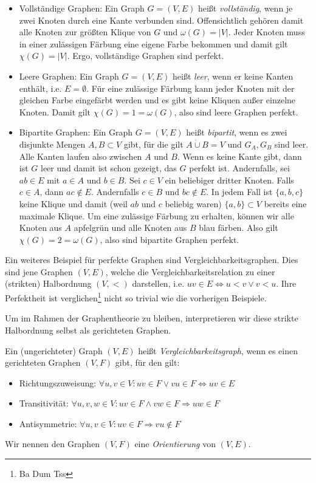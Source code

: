 \documentclass[../main.tex]{subfiles}
\begin{document}
\begin{itemize}
    \item Vollständige Graphen: Ein Graph $G = (V, E)$ heißt \emph{vollständig}, wenn je zwei Knoten durch eine Kante verbunden sind. Offensichtlich gehören damit alle Knoten zur größten Klique von $G$ und $\omega(G) = |V|$. Jeder Knoten muss in einer zulässigen Färbung eine eigene Farbe bekommen und damit gilt $\chi(G) = |V|$. Ergo, vollständige Graphen sind perfekt.
    \item Leere Graphen: Ein Graph $G = (V, E)$ heißt \emph{leer}, wenn er keine Kanten enthält, i.e. $E = \emptyset$. Für eine zulässige Färbung kann jeder Knoten mit der gleichen Farbe eingefärbt werden und es gibt keine Kliquen außer einzelne Knoten. Damit gilt $\chi(G) = 1 = \omega(G)$, also sind leere Graphen perfekt.
    \item Bipartite Graphen: Ein Graph $G = (V, E)$ heißt \emph{bipartit}, wenn es zwei disjunkte Mengen $A, B \subset V$ gibt, für die gilt $A \dot\cup B = V$ und $G_A, G_B$ sind leer. Alle Kanten laufen also zwischen $A$ und $B$. Wenn es keine Kante gibt, dann ist $G$ leer und damit ist schon gezeigt, das $G$ perfekt ist. Andernfalls, sei $ab \in E$ mit $a \in A$ und $b \in B$. Sei $c \in V$ ein beliebiger dritter Knoten. Falls $c \in A$, dann $ac \notin E$. Andernfalls $c \in B$ und $bc \notin E$. In jedem Fall ist $\{a, b, c\}$ keine Klique und damit (weil $ab$ und $c$ beliebig waren) $\{a, b\} \subset V$ bereits eine maximale Klique. Um eine zulässige Färbung zu erhalten, können wir alle Knoten aus $A$ apfelgrün und alle Knoten aus $B$ blau färben. Also gilt $\chi(G) = 2 = \omega(G)$, also sind bipartite Graphen perfekt.
\end{itemize}

Ein weiteres Beispiel für perfekte Graphen sind Vergleichbarkeitsgraphen. Dies sind jene Graphen $(V, E)$, welche die Vergleichbarkeitsrelation zu einer (strikten) Halbordnung $(V, <)$ darstellen, i.e. $uv \in E \Leftrightarrow u < v \vee v < u$. Ihre Perfektheit ist verglichen\footnote{Ba Dum Tss} nicht so trivial wie die vorherigen Beispiele.

Um im Rahmen der Graphentheorie zu bleiben, interpretieren wir diese strikte Halbordnung selbst als gerichteten Graphen.

\begin{definition}[Vergleichbarkeitsgraph]
    Ein (ungerichteter) Graph $(V, E)$ heißt \emph{Vergleichbarkeitsgraph}, wenn es einen gerichteten Graphen $(V, F)$ gibt, für den gilt:
    \begin{itemize}
        \item Richtungszuweisung: $\forall u, v \in V : uv \in F \vee vu \in F \Leftrightarrow uv \in E$
        \item Transitivität: $\forall u, v, w \in V : uv \in F \wedge vw \in F \Rightarrow uw \in F$
        \item Antisymmetrie: $\forall u, v \in V : uv \in F \Rightarrow vu \notin F$
    \end{itemize}
    Wir nennen den Graphen $(V, F)$ eine \emph{Orientierung} von $(V, E)$.
\end{definition}
\end{document}
